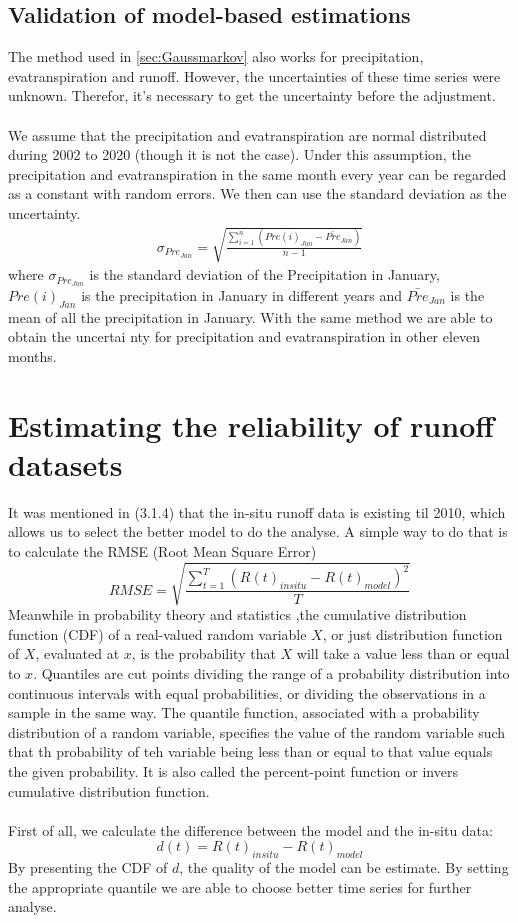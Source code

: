 \subsection{Validation of model-based estimations}
The method used in \ref{sec:Gaussmarkov} also works for precipitation, evatranspiration and runoff. However, the uncertainties of these time series were unknown. Therefor, it's necessary to get the uncertainty before the adjustment. \\\\
We assume that the precipitation and evatranspiration are normal distributed during 2002 to 2020 (though it is not the case). Under this assumption, the precipitation and evatranspiration in the same month every year can be regarded as a constant with random errors. We then can use the standard deviation as the uncertainty.
\begin{gather}
\sigma_{Pre_{Jan}} = \sqrt{\frac{\sum_{i=1}^{n} (Pre(i)_{Jan} - \bar{Pre}_{Jan})}{n-1}}
\end{gather}
where $\sigma_{Pre_{Jan}}$ is the standard deviation of the Precipitation in January, $Pre(i)_{Jan}$ is the precipitation in January in different years and $\bar{Pre}_{Jan}$ is the mean of all the precipitation in January. With the same method we are able to obtain the uncertai nty for precipitation and evatranspiration in other eleven months. 
\section{Estimating the reliability of runoff datasets}
It was mentioned in (3.1.4) that the in-situ runoff data is existing til 2010, which allows us to select the better model to do the analyse. A simple way to do that is to calculate the RMSE (Root Mean Square Error)
\begin{equation*}
	RMSE = \sqrt{\frac{\sum_{t=1}^T (R(t)_{insitu} - R(t)_{model})^2}{T}}
\end{equation*}
Meanwhile in probability theory and statistics ,the cumulative distribution function (CDF) of a real-valued random variable $X$, or just distribution function of $X$, evaluated at $x$, is the probability that $X$ will take a value less than or equal to $x$. Quantiles are cut points dividing the range of a probability distribution into continuous intervals with equal probabilities, or dividing the observations in a sample in the same way. The quantile function, associated with a probability distribution of a random variable, specifies the value of the random variable such that th probability of teh variable being less than or equal to that value equals the given probability. It is also called the percent-point function or invers cumulative distribution function. \\\\
First of all, we calculate the difference between the model and the in-situ data:
\begin{equation}
d(t) = R(t)_{insitu} - R(t)_{model}
\end{equation}
By presenting the CDF of $d$, the quality of the model can be estimate. By setting the appropriate quantile we are able to choose better time series for further analyse. 
